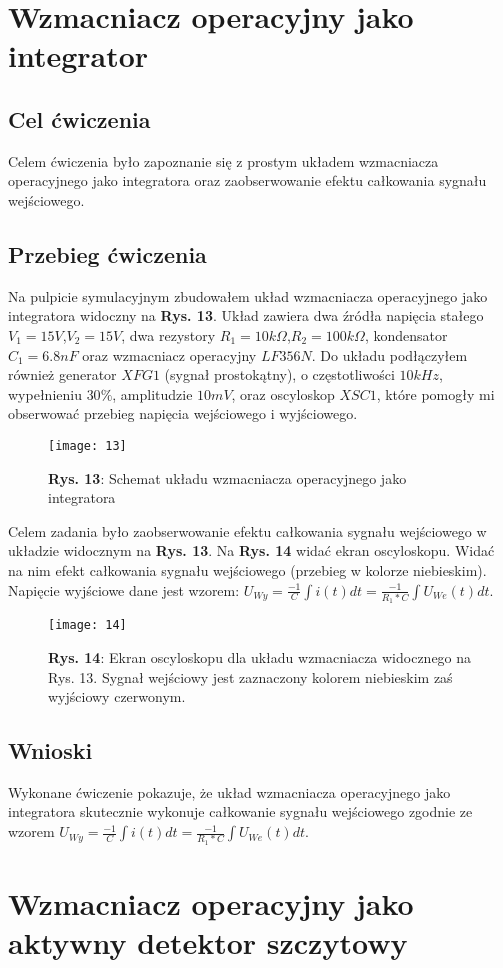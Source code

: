 \documentclass[11pt]{article}
\begin{document}
\section{Wzmacniacz operacyjny jako integrator}
\subsection{Cel ćwiczenia}
Celem ćwiczenia było zapoznanie się z prostym układem wzmacniacza operacyjnego jako integratora oraz zaobserwowanie efektu całkowania sygnału wejściowego.
\subsection{Przebieg ćwiczenia}
Na pulpicie symulacyjnym zbudowałem układ wzmacniacza operacyjnego jako integratora widoczny na \textbf{Rys. 13}. Układ zawiera dwa źródła napięcia stałego $V_1=15V$,$V_2=15V$, dwa rezystory $R_1=10k\Omega$,$R_2=100k\Omega$, kondensator $C_1=6.8nF$ oraz wzmacniacz operacyjny $LF356N$. Do układu podłączyłem również generator $XFG1$ (sygnał prostokątny), o częstotliwości $10kHz$, wypełnieniu $30\%$, amplitudzie $10mV$, oraz oscyloskop $XSC1$, które pomogły mi obserwować przebieg napięcia wejściowego i wyjściowego.
\begin{figure}[H]
\centering
\texttt{[image: 13]}
\caption*{\textbf{Rys. 13}: Schemat układu wzmacniacza operacyjnego jako integratora}
\end{figure}
\noindent Celem zadania było zaobserwowanie efektu całkowania sygnału wejściowego w układzie widocznym na \textbf{Rys. 13}. Na \textbf{Rys. 14} widać ekran oscyloskopu. Widać na nim efekt całkowania sygnału wejściowego (przebieg w kolorze niebieskim). Napięcie wyjściowe dane jest wzorem: 
$U_{Wy}=\frac{-1}{C}{\int}i(t)dt=\frac{-1}{R_1*C}{\int}U_{We}(t)dt$.
\begin{figure}[H]
\centering
\texttt{[image: 14]}
\caption*{\textbf{Rys. 14}: Ekran oscyloskopu dla układu wzmacniacza widocznego na Rys. 13. Sygnał wejściowy jest zaznaczony kolorem niebieskim zaś wyjściowy czerwonym. }
\end{figure}
\subsection{Wnioski}
Wykonane ćwiczenie pokazuje, że układ wzmacniacza operacyjnego jako integratora skutecznie wykonuje całkowanie sygnału wejściowego zgodnie ze wzorem $U_{Wy}=\frac{-1}{C}{\int}i(t)dt=\frac{-1}{R_1*C}{\int}U_{We}(t)dt$. 
\section{Wzmacniacz operacyjny jako aktywny detektor szczytowy}
\end{document}
